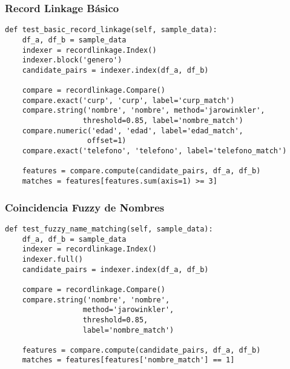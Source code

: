 \documentclass[12pt]{article}
\begin{document}
\subsubsection{Record Linkage Básico}
\begin{lstlisting}[caption=Prueba de record linkage básico]
def test_basic_record_linkage(self, sample_data):
    df_a, df_b = sample_data
    indexer = recordlinkage.Index()
    indexer.block('genero')
    candidate_pairs = indexer.index(df_a, df_b)
    
    compare = recordlinkage.Compare()
    compare.exact('curp', 'curp', label='curp_match')
    compare.string('nombre', 'nombre', method='jarowinkler', 
                  threshold=0.85, label='nombre_match')
    compare.numeric('edad', 'edad', label='edad_match', 
                   offset=1)
    compare.exact('telefono', 'telefono', label='telefono_match')
    
    features = compare.compute(candidate_pairs, df_a, df_b)
    matches = features[features.sum(axis=1) >= 3]
\end{lstlisting}

\subsubsection{Coincidencia Fuzzy de Nombres}
\begin{lstlisting}[caption=Prueba de coincidencia fuzzy de nombres]
def test_fuzzy_name_matching(self, sample_data):
    df_a, df_b = sample_data
    indexer = recordlinkage.Index()
    indexer.full()
    candidate_pairs = indexer.index(df_a, df_b)
    
    compare = recordlinkage.Compare()
    compare.string('nombre', 'nombre', 
                  method='jarowinkler', 
                  threshold=0.85,
                  label='nombre_match')
    
    features = compare.compute(candidate_pairs, df_a, df_b)
    matches = features[features['nombre_match'] == 1]
\end{lstlisting}
\end{document}
